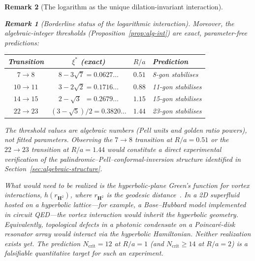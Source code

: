 \documentclass[12pt, a4paper]{article}
\newtheorem{remark}{Remark}[section]
\numberwithin{equation}{section}
\begin{document}
\begin{remark}[The logarithm as the unique dilation-invariant interaction]
\begin{remark}[Borderline status of the logarithmic interaction]
Moreover, the algebraic-integer thresholds
(Proposition~\ref{prop:alg-int}) are \emph{exact, parameter-free}
predictions:
\begin{center}
\begin{tabular}{cccl}
\toprule
Transition & $\xi^*$ (exact) & $R/a$ & Prediction \\
\midrule
$7 \to 8$   & $8 - 3\sqrt{7} = 0.0627\ldots$ & $0.51$ &
  8-gon stabilises \\
$10 \to 11$ & $3 - 2\sqrt{2} = 0.1716\ldots$ & $0.88$ &
  11-gon stabilises \\
$14 \to 15$ & $2 - \sqrt{3}\phantom{0} = 0.2679\ldots$ & $1.15$ &
  15-gon stabilises \\
$22 \to 23$ & $(3{-}\sqrt{5})/2 = 0.3820\ldots$ & $1.44$ &
  23-gon stabilises \\
\bottomrule
\end{tabular}
\end{center}
The threshold values are algebraic numbers (Pell units and golden
ratio powers), not fitted parameters.  Observing the $7 \to 8$
transition at $R/a = 0.51$ or the $22 \to 23$ transition at
$R/a = 1.44$ would constitute a direct experimental verification
of the palindromic--Pell--conformal-inversion structure identified
in Section~\ref{sec:algebraic-structure}.

What would need to be realized is the hyperbolic-plane Green's
function for vortex interactions, $h(r_{\mathbf{H}^2})$, where
$r_{\mathbf{H}^2}$ is the geodesic distance~\citep{Kimura1999}.
In a 2D superfluid hosted on a hyperbolic lattice---for example,
a Bose--Hubbard model implemented in circuit QED---the vortex
interaction would inherit the hyperbolic geometry.  Equivalently,
topological defects in a photonic condensate on a Poincar\'e-disk
resonator array would interact via the hyperbolic Hamiltonian.
Neither realization exists yet.  The prediction $N_{\mathrm{crit}} = 12$
at $R/a = 1$ (and $N_{\mathrm{crit}} \ge 14$ at $R/a = 2$) is
a falsifiable quantitative target for such an experiment.


\end{remark}
\end{remark}
\end{document}
